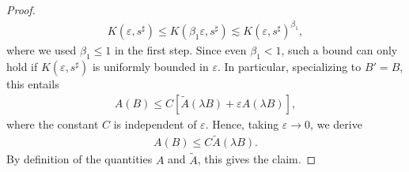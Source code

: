 \documentclass[10pt,a4paper]{amsart}
\newcommand{\eps}{\varepsilon}
\newcommand{\wt}{\widetilde}
\begin{document}
\begin{proof}
		\begin{align}
			K(\eps, s^\sharp) \leq K(\beta_1 \eps, s^\sharp) \lesssim K(\eps, s^\sharp)^{\beta_1},
		\end{align}
		where we used $\beta_1 \leq 1$ in the first step. Since even $\beta_1 < 1$, such a bound can only hold if $K(\eps, s^\sharp)$ is uniformly bounded in $\eps$. In particular, {specializing to $B' = B$,} this entails
		\begin{align}
			A(B) \leq C \left[ \wt A(\lambda B) + \eps A(\lambda B) \right],
		\end{align}
		where the constant $C$ is independent of $\eps$. Hence, taking $\eps \to 0$, we derive
		\begin{align}
			A(B) \leq C \wt A(\lambda B).
		\end{align}
		By definition of the quantities $A$ and $\wt A$, this gives the claim.
	\end{proof}
\end{document}
